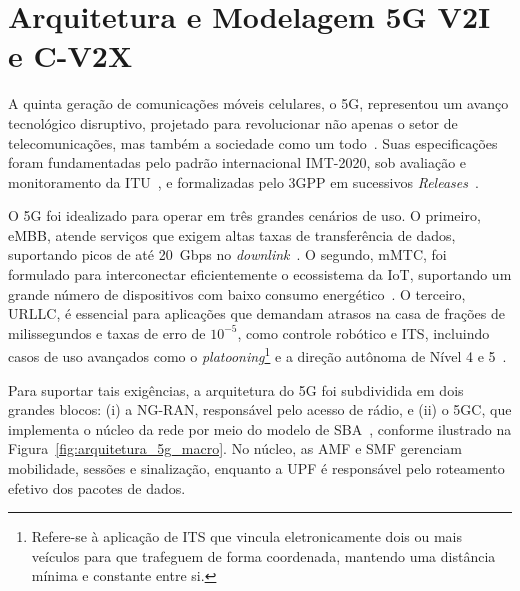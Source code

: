 % 

\section{Arquitetura e Modelagem \texorpdfstring{\gls{5G}}{5G} \texorpdfstring{\gls{V2I}}{\gls{V2I}} e \texorpdfstring{\gls{C-V2X}}{C-\gls{V2X}}}
\label{sec:comunicacao-5g-e-sidelink}

A quinta geração de comunicações móveis celulares, o \gls{5G}, representou um avanço tecnológico disruptivo, projetado para revolucionar não apenas o setor de telecomunicações, mas também a sociedade como um todo~\cite{stallings2021}. Suas especificações foram fundamentadas pelo padrão internacional IMT-2020, sob avaliação e monitoramento da \gls{ITU}~\cite{itu2015m2083, itu2017m2410, itu2021m2150}, e formalizadas pelo \gls{3GPP} em sucessivos \textit{Releases}~\cite{asplund2025, cox2025}.

O \gls{5G} foi idealizado para operar em três grandes cenários de uso. O primeiro, \gls{eMBB}, atende serviços que exigem altas taxas de transferência de dados, suportando picos de até 20~Gbps no \textit{downlink}~\cite{stallings2021}. O segundo, \gls{mMTC}, foi formulado para interconectar eficientemente o ecossistema da \gls{IoT}, suportando um grande número de dispositivos com baixo consumo energético~\cite{morais2025, raghavan2025}. O terceiro, \gls{URLLC}, é essencial para aplicações que demandam atrasos na casa de frações de milissegundos e taxas de erro de $10^{-5}$, como controle robótico e \gls{ITS}, incluindo casos de uso avançados como o \textit{platooning}\footnote{Refere-se à aplicação de \gls{ITS} que vincula eletronicamente dois ou mais veículos para que trafeguem de forma coordenada, mantendo uma distância mínima e constante entre si.} e a direção autônoma de Nível 4 e 5~\cite{sae2021j3016, raghavan2025, sheikh2026}.

Para suportar tais exigências, a arquitetura do \gls{5G} foi subdividida em dois grandes blocos: (i) a \gls{NG-RAN}, responsável pelo acesso de rádio, e (ii) o \gls{5GC}, que implementa o núcleo da rede por meio do modelo de \gls{SBA}~\cite{stallings2021}, conforme ilustrado na Figura~\ref{fig:arquitetura_5g_macro}. No núcleo, as \gls{AMF} e \gls{SMF} gerenciam mobilidade, sessões e sinalização, enquanto a \gls{UPF} é responsável pelo roteamento efetivo dos pacotes de dados.

